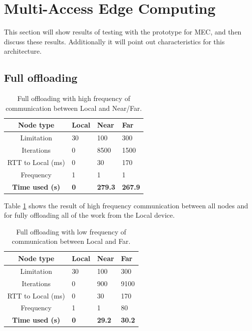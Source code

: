 

\section{Multi-Access Edge Computing} \label{section:MEC_evaluation}
This section will show results of testing with the prototype for MEC, and then discuss these results. Additionally it will point out characteristics for this architecture.

\subsection{Full offloading}
\begin{table}[h!]
    \centering
    \begin{tabular}[c]{|c||p{2cm}|p{2cm}|p{2cm}|}
        \hline
        Node type & Local & Near & Far \\
        \hline
        Limitation          & 30 & 100 & 300  \\
        \hline
        Iterations          & 0 & 8500 & 1500  \\
        \hline
        RTT to Local (ms)   & 0 & 30 & 170 \\
        \hline
        Frequency           & 1 & 1 & 1 \\
        \hline
        \hline
        \hline
        \textbf{Time used (s)}       & \textbf{0} & \textbf{279.3} & \textbf{267.9} \\
        \hline
    \end{tabular}
    \caption{Full offloading with high frequency of communication between Local and Near/Far.}
    \label{tab:MEC_full_offloading_high_frequency}
\end{table}

Table \ref{tab:MEC_full_offloading_high_frequency} shows the result of high frequency communication between all nodes and for fully offloading all of the work from the Local device.



\begin{table}[h!]
    \centering
    \begin{tabular}[c]{|c||p{2cm}|p{2cm}|p{2cm}|}
        \hline
        Node type & Local & Near & Far \\
        \hline
        Limitation          & 30 & 100 & 300  \\
        \hline
        Iterations          & 0 & 900 & 9100  \\
        \hline
        RTT to Local (ms)   & 0 & 30 & 170 \\
        \hline
        Frequency           & 1 & 1 & 80 \\
        \hline
        \hline
        \hline
        \textbf{Time used (s)}       & \textbf{0} & \textbf{29.2} & \textbf{30.2} \\
        \hline
    \end{tabular}
    \caption{Full offloading with low frequency of communication between Local and Far.}
    \label{tab:MEC_full_offloading_low_frequency}
\end{table}

